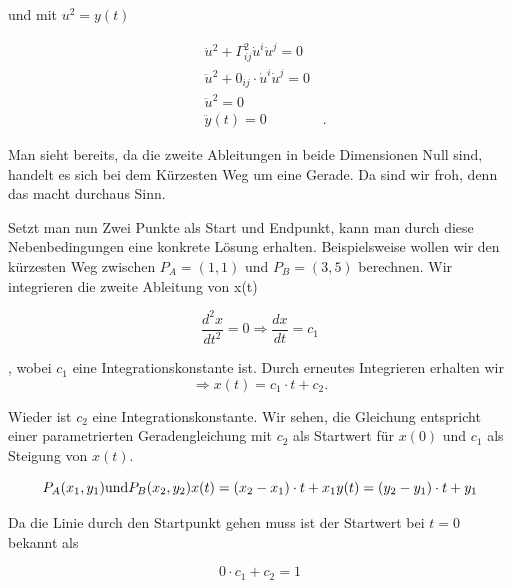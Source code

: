 und mit $u^2 = y(t)$

\begin{equation}
\begin{aligned}
&\ddot{u}^2 + \Gamma_{ij}^2 \dot{u}^i \dot{u}^j = 0 \\
&\ddot{u}^2 + 0_{ij} \cdot \dot{u}^i \dot{u}^j = 0 \\
&\ddot{u}^2 = 0 \\
&\ddot{y}(t) = 0 \qquad \qquad .
\end{aligned}
\label{geodaeten:equation:Standardverfahren:Kartesisch:y}
\end{equation}

Man sieht bereits, da die zweite Ableitungen in beide Dimensionen Null sind, handelt es sich bei dem Kürzesten Weg um eine Gerade.
Da sind wir froh, denn das macht durchaus Sinn.

Setzt man nun Zwei Punkte als Start und Endpunkt, kann man durch diese Nebenbedingungen eine konkrete Lösung erhalten.
Beispielsweise wollen wir den kürzesten Weg zwischen $P_A = (1,1)$ und $P_B = (3,5)$ berechnen. Wir integrieren die zweite Ableitung von x(t)

\begin{equation}
	\frac{d^2x}{dt^2} = 0 \Rightarrow \frac{dx}{dt} = c_1 
\end{equation}

, wobei $c_1$ eine Integrationskonstante ist. Durch erneutes Integrieren erhalten wir
\begin{equation}
\Rightarrow x(t) = c_1 \cdot t + c_2  .
\label{geodaeten:equation:Standardverfahren:Kartesisch:equation1}
\end{equation}

Wieder ist $c_2$ eine Integrationskonstante. 
Wir sehen, die Gleichung entspricht einer parametrierten Geradengleichung mit $c_2$ als Startwert für $x(0)$ und $c_1$ als Steigung von $x(t)$.

\begin{equation}
	P_A(x_1,y_1) \text{und} P_B(x_2,y_2)\\
	x(t) = (x_2 - x_1) \cdot t + x_1\\
	y(t) = (y_2 - y_1) \cdot t + y_1
\end{equation}

Da die Linie durch den Startpunkt gehen muss ist der Startwert bei $t=0$ bekannt als
 
\begin{equation}
	0 \cdot c_1 + c_2 = 1
\end{equation}
	
